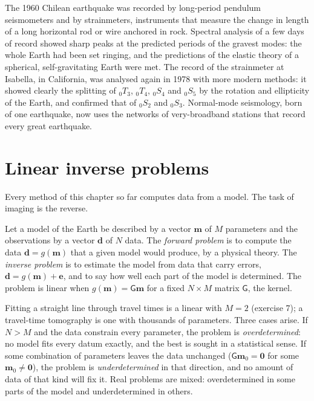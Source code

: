 \begin{history}
The 1960 Chilean earthquake was recorded by long-period pendulum seismometers
and by strainmeters, instruments that measure the change in length of a
long horizontal rod or wire anchored in rock. Spectral analysis of a few days of
record showed sharp peaks at the predicted periods of the gravest modes: the
whole Earth had been set ringing, and the predictions of the elastic theory
of a spherical, self-gravitating Earth were met. The record of the strainmeter
at Isabella, in California, was analysed again in 1978 with more modern
methods: it showed clearly the splitting of ${}_0T_3$, ${}_0T_4$, ${}_0S_4$
and ${}_0S_5$ by the rotation and ellipticity of the Earth, and confirmed that
of ${}_0S_2$ and ${}_0S_3$.
Normal-mode seismology, born of one earthquake, now uses the networks of
very-broadband stations that record every great earthquake.
\end{history}

\section{Linear inverse problems}\label{sec:b3:seismology-imaging:inverse}

Every method of this chapter so far computes data from a model. The task of
imaging is the reverse.

\begin{definition}\label{def:b3:seismology-imaging:inverse}
Let a model of the Earth be described by a vector $\mathbf m$ of $M$ parameters
and the observations by a vector $\mathbf d$ of $N$ data. The \emph{forward
problem} is to compute the data $\mathbf d = g(\mathbf m)$
that a given model would produce, by a physical theory. The \emph{inverse
problem} is to estimate the model from data that carry
errors, $\mathbf d = g(\mathbf m) + \mathbf e$, and to say how well each part
of the model is determined. The problem is linear when $g(\mathbf m) =
\mathsf G\mathbf m$ for a fixed $N\times M$ matrix $\mathsf G$, the kernel.
\end{definition}

Fitting a straight line through travel times is a linear  with
$M = 2$ (exercise 7); a travel-time tomography is one with thousands of
parameters. Three cases arise. If $N > M$ and the data constrain every
parameter, the problem is \emph{overdetermined}: no model fits every datum
exactly, and the best is sought in a statistical sense. If some combination of
parameters leaves the data unchanged ($\mathsf G\mathbf m_0 = \mathbf 0$ for
some $\mathbf m_0 \ne \mathbf 0$), the problem is \emph{underdetermined} in that
direction, and no amount of data of that kind will fix it. Real problems are
mixed: overdetermined in some parts of the model and underdetermined in
others.

